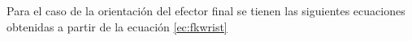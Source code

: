  
Para el caso de la orientación del efector final se tienen las siguientes ecuaciones obtenidas a partir de la ecuación \ref{ec:fkwrist} 




%
%
%
%
%
%




















